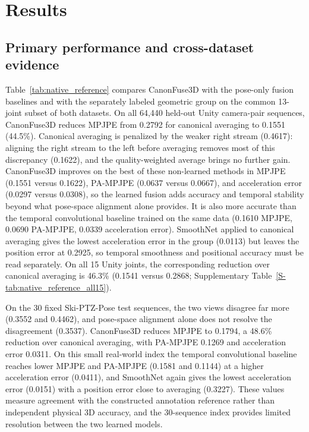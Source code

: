\documentclass[preprint,12pt]{elsarticle}
\begin{document}
\section{Results}
\label{sec:results}

\subsection{Primary performance and cross-dataset evidence}

Table~\ref{tab:native_reference} compares CanonFuse3D with the pose-only fusion baselines and with the separately labeled geometric group on the common 13-joint subset of both datasets. On all 64,440 held-out Unity camera-pair sequences, CanonFuse3D reduces MPJPE from 0.2792 for canonical averaging to 0.1551 (44.5\%). Canonical averaging is penalized by the weaker right stream (0.4617): aligning the right stream to the left before averaging removes most of this discrepancy (0.1622), and the quality-weighted average brings no further gain. CanonFuse3D improves on the best of these non-learned methods in MPJPE (0.1551 versus 0.1622), PA-MPJPE (0.0637 versus 0.0667), and acceleration error (0.0297 versus 0.0308), so the learned fusion adds accuracy and temporal stability beyond what pose-space alignment alone provides. It is also more accurate than the temporal convolutional baseline trained on the same data (0.1610 MPJPE, 0.0690 PA-MPJPE, 0.0339 acceleration error). SmoothNet applied to canonical averaging gives the lowest acceleration error in the group (0.0113) but leaves the position error at 0.2925, so temporal smoothness and positional accuracy must be read separately. On all 15 Unity joints, the corresponding reduction over canonical averaging is 46.3\% (0.1541 versus 0.2868; Supplementary Table~\ref{S-tab:native_reference_all15}).

On the 30 fixed Ski-PTZ-Pose test sequences, the two views disagree far more (0.3552 and 0.4462), and pose-space alignment alone does not resolve the disagreement (0.3537). CanonFuse3D reduces MPJPE to 0.1794, a 48.6\% reduction over canonical averaging, with PA-MPJPE 0.1269 and acceleration error 0.0311. On this small real-world index the temporal convolutional baseline reaches lower MPJPE and PA-MPJPE (0.1581 and 0.1144) at a higher acceleration error (0.0411), and SmoothNet again gives the lowest acceleration error (0.0151) with a position error close to averaging (0.3227). These values measure agreement with the constructed annotation reference rather than independent physical 3D accuracy, and the 30-sequence index provides limited resolution between the two learned models.
\end{document}
